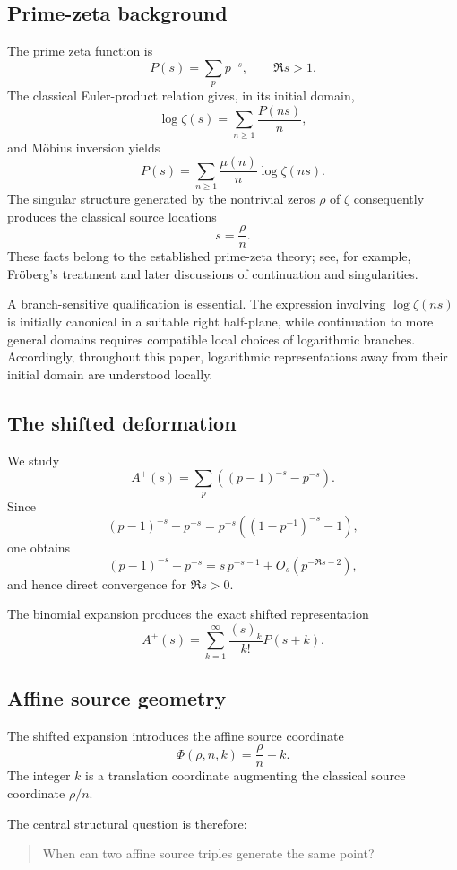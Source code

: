 \documentclass[11pt]{article}
\theoremstyle{definition}
\newcommand{\PhiA}{\Phi}
\begin{document}
\subsection{Prime-zeta background}

The prime zeta function is
\[
P(s)=\sum_p p^{-s},\qquad \Re s>1.
\]
The classical Euler-product relation gives, in its initial domain,
\[
\log\zeta(s)=\sum_{n\ge1}\frac{P(ns)}{n},
\]
and Möbius inversion yields
\[
P(s)=\sum_{n\ge1}\frac{\mu(n)}{n}\log\zeta(ns).
\]
The singular structure generated by the nontrivial zeros $\rho$ of $\zeta$ consequently produces the classical source locations
\[
s=\frac{\rho}{n}.
\]
These facts belong to the established prime-zeta theory; see, for example, Fröberg's treatment and later discussions of continuation and singularities.

A branch-sensitive qualification is essential. The expression involving
$\log\zeta(ns)$ is initially canonical in a suitable right half-plane, while continuation to more general domains requires compatible local choices of logarithmic branches. Accordingly, throughout this paper, logarithmic representations away from their initial domain are understood locally.

\subsection{The shifted deformation}

We study
\[
A^+(s)=\sum_p\left((p-1)^{-s}-p^{-s}\right).
\]
Since
\[
(p-1)^{-s}-p^{-s}
=
p^{-s}\left((1-p^{-1})^{-s}-1\right),
\]
one obtains
\[
(p-1)^{-s}-p^{-s}
=
s\,p^{-s-1}+O_s(p^{-\Re s-2}),
\]
and hence direct convergence for $\Re s>0$.

The binomial expansion produces the exact shifted representation
\[
A^+(s)=
\sum_{k=1}^{\infty}\frac{(s)_k}{k!}P(s+k).
\]

\subsection{Affine source geometry}

The shifted expansion introduces the affine source coordinate
\[
\PhiA(\rho,n,k)=\frac{\rho}{n}-k.
\]
The integer $k$ is a translation coordinate augmenting the classical source coordinate $\rho/n$.

The central structural question is therefore:

\begin{quote}
When can two affine source triples generate the same point?
\end{quote}
\end{document}
